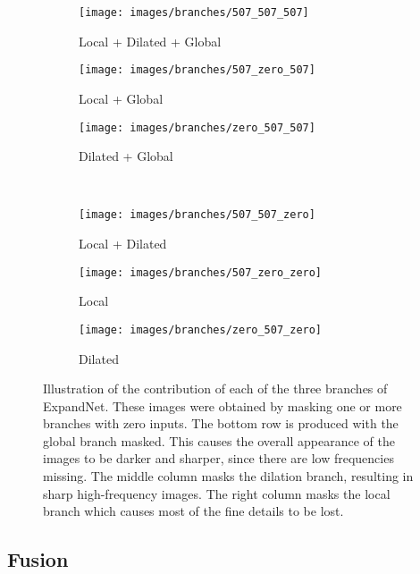 \documentclass{egpubl}
\begin{document}
\begin{figure*}[htb]
    \centering
    \begin{subfigure}[t]{0.3\linewidth}
        \centering
        \texttt{[image: images/branches/507\_507\_507]}
        \caption{Local + Dilated + Global}
    \end{subfigure}
    \begin{subfigure}[t]{0.3\linewidth}
        \centering
        \texttt{[image: images/branches/507\_zero\_507]}
        \caption{Local + Global}\label{fig:branches:LG}
    \end{subfigure}
    \begin{subfigure}[t]{0.3\linewidth}
        \centering
        \texttt{[image: images/branches/zero\_507\_507]}
        \caption{Dilated + Global}\label{fig:branches:DG}
    \end{subfigure}\\
    \begin{subfigure}[t]{0.3\linewidth}
        \centering
        \texttt{[image: images/branches/507\_507\_zero]}
        \caption{Local + Dilated}
    \end{subfigure}
    \begin{subfigure}[t]{0.3\linewidth}
        \centering
        \texttt{[image: images/branches/507\_zero\_zero]}
        \caption{Local}
    \end{subfigure}
    \begin{subfigure}[t]{0.3\linewidth}
        \centering
        \texttt{[image: images/branches/zero\_507\_zero]}
        \caption{Dilated}
    \end{subfigure}
    \caption{Illustration of the contribution of each of the three branches of
    ExpandNet. These images were obtained by masking one or more branches with
    zero inputs. The bottom row is produced with the global branch masked. This
    causes the overall appearance of the images to be darker and sharper, since
    there are low frequencies missing. The middle column masks the dilation
    branch, resulting in sharp high-frequency images. The right column masks
    the local branch which causes most of the fine details to be
    lost.}\label{fig:branches}
\end{figure*}


\subsection{\textbf{Fusion}}
\end{document}
